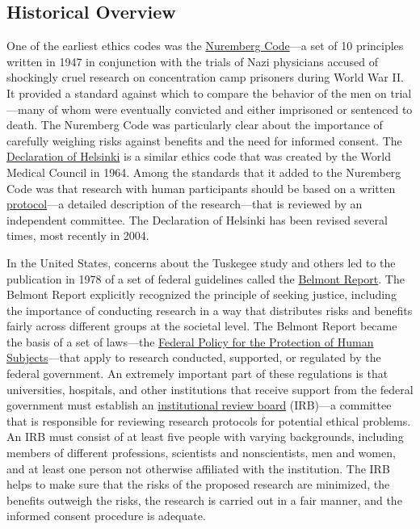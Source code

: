 \documentclass[
]{krantz}
\begin{document}
\subsection*{Historical Overview}\label{historical-overview}


One of the earliest ethics codes was the \hyperref[nuremberg-code]{Nuremberg Code}---a set of 10 principles written in 1947 in conjunction with the trials of Nazi physicians accused of shockingly cruel research on concentration camp prisoners during World War II. It provided a standard against which to compare the behavior of the men on trial---many of whom were eventually convicted and either imprisoned or sentenced to death. The Nuremberg Code was particularly clear about the importance of carefully weighing risks against benefits and the need for informed consent. The \hyperref[declaration-of-helsinki]{Declaration of Helsinki} is a similar ethics code that was created by the World Medical Council in 1964. Among the standards that it added to the Nuremberg Code was that research with human participants should be based on a written \hyperref[protocol]{protocol}---a detailed description of the research---that is reviewed by an independent committee. The Declaration of Helsinki has been revised several times, most recently in 2004.

In the United States, concerns about the Tuskegee study and others led to the publication in 1978 of a set of federal guidelines called the \hyperref[belmont-report]{Belmont Report}. The Belmont Report explicitly recognized the principle of seeking justice, including the importance of conducting research in a way that distributes risks and benefits fairly across different groups at the societal level. The Belmont Report became the basis of a set of laws---the \hyperref[federal-policy-for-the-protection-of-human-subjects]{Federal Policy for the Protection of Human Subjects}---that apply to research conducted, supported, or regulated by the federal government. An extremely important part of these regulations is that universities, hospitals, and other institutions that receive support from the federal government must establish an \hyperref[institutional-review-board]{institutional review board} (IRB)---a committee that is responsible for reviewing research protocols for potential ethical problems. An IRB must consist of at least five people with varying backgrounds, including members of different professions, scientists and nonscientists, men and women, and at least one person not otherwise affiliated with the institution. The IRB helps to make sure that the risks of the proposed research are minimized, the benefits outweigh the risks, the research is carried out in a fair manner, and the informed consent procedure is adequate.
\end{document}
